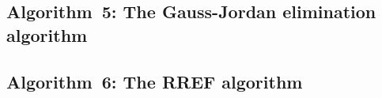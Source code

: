 \documentclass[a4paper]{article}
\begin{document}
\subsection{Algorithm~5: The Gauss-Jordan elimination algorithm}%
\label{algorithm:5}

\subsection{Algorithm~6: The RREF algorithm}%
\label{algorithm:6}

% 
% 
% 
% 
% 
% 
% 


\clearpage

\nocite{Zdunek, GoluVanl96}


\end{document}
